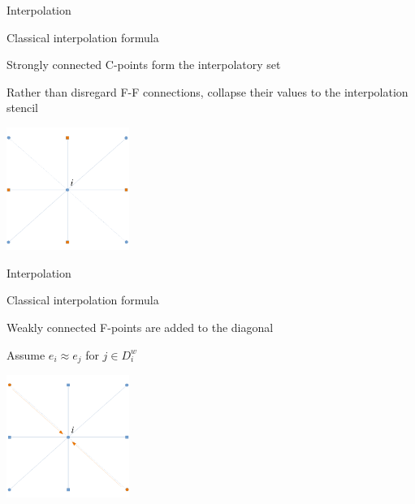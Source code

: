 \documentclass[18pt,xcolor=table]{beamer}
\begin{document}
\begin{frame}{Interpolation}
\begin{block}{Classical interpolation formula}
\bit
\item Strongly connected C-points form the interpolatory set
\item Rather than disregard F-F connections, collapse their values to the interpolation stencil
\eit
\end{block}
\begin{center}
\includegraphics[width=0.3\textwidth]{../figures/interpStencilCpts}
\end{center}
\end{frame}

\begin{frame}{Interpolation}
\begin{block}{Classical interpolation formula}
\bit
\item Weakly connected F-points are added to the diagonal
\item Assume $e_i\approx e_j$ for $j\in D^w_i$
\eit
\end{block}
\begin{center}
\includegraphics[width=0.3\textwidth]{../figures/interpStencilWeakF}
\end{center}
\end{frame}
\end{document}
